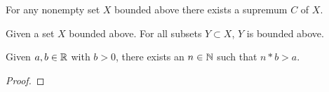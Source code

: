 \begin{axiom}\label{ax:complax}
   \leanok
  For any nonempty set $X$ bounded above there exists a supremum $C$ of $X$.
\end{axiom}

\begin{lemma}\label{lem:subsetboundbounded}
   \leanok
  Given a set $X$ bounded above.
  For all subsets $Y \subset X$,
  $Y$ is bounded above.
\end{lemma}

\begin{theorem}[Archimedes]\label{thm:archimedes}
  Given $a, b \in \mathbb{R}$ with $b > 0$,
  there exists an $n \in \mathbb{N}$ such that $n * b > a$.
\end{theorem}
\begin{proof}
\end{proof}

